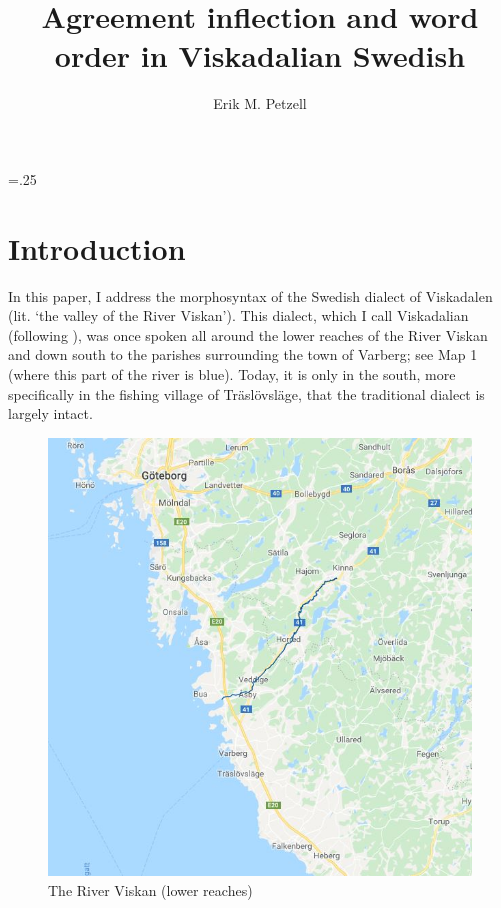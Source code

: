 \documentclass[output=paper,colorlinks,citecolor=brown,draft,draftmode]{langscibook}
\author{Erik M. Petzell\orcid{}\affiliation{Institute for Language and Folklore, Gothenburg}}
\title{Agreement inflection and word order in Viskadalian Swedish}
\begin{document}
\multicolsep=.25\baselineskip
\maketitle


\section{Introduction}\label{sec:petzell:1}


In this paper, I address the morphosyntax of the Swedish dialect of Viskadalen (lit. ‘the valley of the River Viskan’). This dialect, which I call Viskadalian (following \citealt{Petzell2017}), was once spoken all around the lower reaches of the River Viskan and down south to the parishes surrounding the town of Varberg; see Map 1 (where this part of the river is blue). Today, it is only in the south, more specifically in the fishing village of Träslövsläge, that the traditional dialect is largely intact. 

\begin{figure}
\includegraphics[width=\textwidth]{figures/a7-img001.jpg}
\caption{\label{figmap:petzell:1}The River Viskan (lower reaches)}
\end{figure}
\end{document}
